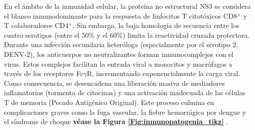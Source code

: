 En el ámbito de la inmunidad celular, la proteína no estructural NS3 se considera el blanco inmunodominante para la respuesta de linfocitos T citotóxicos CD8$^+$ y T colaboradores CD4$^+$. Sin embargo, la baja homología de secuencia entre los cuatro serotipos (entre el 50\% y el 60\%) limita la reactividad cruzada protectora. Durante una infección secundaria heteróloga (especialmente por el serotipo 2, DENV-2), los anticuerpos no neutralizantes forman inmunocomplejos con el virus. Estos complejos facilitan la entrada viral a monocitos y macrófagos a través de los receptores Fc$\gamma$R, incrementando exponencialmente la carga viral. Como consecuencia, se desencadena una liberación masiva de mediadores inflamatorios (tormenta de citocinas) y una activación inadecuada de las células T de memoria (Pecado Antigénico Original). Este proceso culmina en complicaciones graves como la fuga vascular, la fiebre hemorrágica por dengue y el síndrome de choque \textbf{véase la Figura \ref{Fig:inmunopatogenia_tikz}} \cite{st2019adaptive}.

